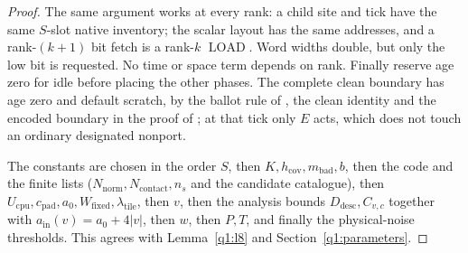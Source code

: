 \begin{proof}
The same argument works at every rank: a child site and tick have the same \(S\)-slot native inventory; the scalar layout has the same addresses, and a rank-\((k+1)\) bit fetch is a rank-\(k\) \(\operatorname{LOAD}\). Word widths double, but only the low bit is requested. No time or space term depends on rank. Finally reserve age zero for idle before placing the other phases. The complete clean boundary has age zero and default scratch, by the ballot rule of \cite[Section~\ref*{cl:sec:verifier}]{DMNoise1D2026}, the clean identity \cite[Lemma~\ref*{cl:lem:clean}]{DMNoise1D2026} and the encoded boundary in the proof of \cite[Lemma~\ref*{cl:lem:past}]{DMNoise1D2026}; at that tick only \(E\) acts, which does not touch an ordinary designated nonport.

The constants are chosen in the order \(S\), then \(K,h_{\mathrm{cov}},m_{\mathrm{bad}},b\), then the code and the finite lists (\(N_{\mathrm{norm}},N_{\mathrm{contact}},n_s\) and the candidate catalogue), then \(U_{\mathrm{cpu}},c_{\mathrm{pad}},a_0,W_{\mathrm{fixed}},\lambda_{\mathrm{tile}}\), then \(v\), then the analysis bounds \(D_{\mathrm{desc}},C_{v,c}\) together with \(a_{\mathrm{in}}(v)=a_0+4|v|\), then \(w\), then \(P,T\), and finally the physical-noise thresholds. This agrees with Lemma~\ref{q1:l8} and Section~\ref{q1:parameters}.
\end{proof}

